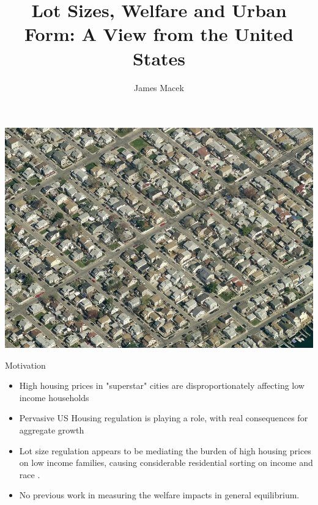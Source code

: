\documentclass{beamer}
\title{Lot Sizes, Welfare and Urban Form: A View from the United States}
\author{James Macek}
\theoremstyle{plain}
\begin{document}
\begin{frame}[plain]
	\maketitle
\end{frame}

\begin{frame}
	\includegraphics[width = \textwidth]{Gerritsen.jpg}
\end{frame}

\begin{frame}{Motivation}
	\begin{itemize}
		\itemsep1em
		\color{black}
		\item High housing prices in "superstar" cities are disproportionately affecting low income households \citep{albouyetal} \pause
		\item Pervasive US Housing regulation is playing a role, with real consequences for \color{red} aggregate growth \color{black} \citep{hseihmoretti} \citep{durantonpugaurbgrowth} \citep{parkho} \pause
	
		\item Lot size regulation appears to be mediating the burden of high housing prices on low income families, causing considerable \color{red} residential sorting on income \color{black} and race  \citep{kulka} \citep{Song}. \pause
		
		\item No previous work in measuring the welfare impacts in \color{red} general equilibrium\color{black}.
	\end{itemize}
\end{frame}
\end{document}
